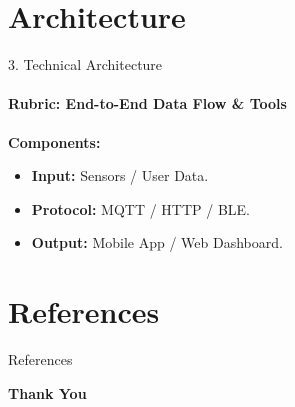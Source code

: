 \documentclass[aspectratio=169, 11pt]{beamer}
\begin{document}
\section{Architecture}
\begin{frame}{3. Technical Architecture}
    \framesubtitle{Rubric: End-to-End Data Flow & Tools}
    \textbf{Components:}
    \begin{itemize}
        \item \textbf{Input:} Sensors / User Data.
        \item \textbf{Protocol:} MQTT / HTTP / BLE.
        \item \textbf{Output:} Mobile App / Web Dashboard.
    \end{itemize}
    
    \vspace{0.2cm}
    \centering
\end{frame}

\section{References}
\begin{frame}[allowframebreaks]{References}
    
     
\end{frame}

\begin{frame}
    \centering    
    {\Huge \textbf{\textcolor{amritaMaroon}{Thank You}}}
\end{frame}
\end{document}
